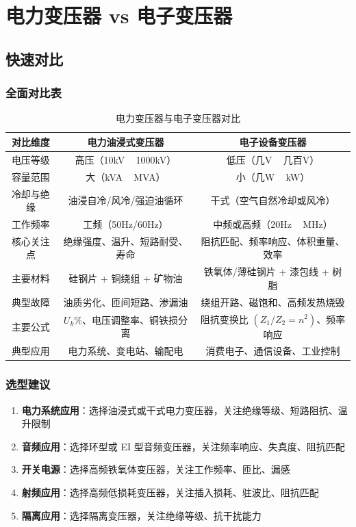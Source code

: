 \documentclass[12pt,UTF8]{ctexbook}
\begin{document}
\part{电力变压器 vs 电子变压器}

\chapter{快速对比}
\label{chap:comparison}

\section{全面对比表}

\begin{table}[htbp]
\centering
\caption{电力变压器与电子变压器对比}
\small
\begin{tabular}{|c|c|c|}
\hline
\textbf{对比维度} & \textbf{电力油浸式变压器} & \textbf{电子设备变压器} \\
\hline
电压等级 & 高压（10kV ~ 1000kV） & 低压（几V ~ 几百V） \\
\hline
容量范围 & 大（kVA ~ MVA） & 小（几W ~ kW） \\
\hline
冷却与绝缘 & 油浸自冷/风冷/强迫油循环 & 干式（空气自然冷却或风冷） \\
\hline
工作频率 & 工频（50Hz/60Hz） & 中频或高频（20Hz ~ MHz） \\
\hline
核心关注点 & 绝缘强度、温升、短路耐受、寿命 & 阻抗匹配、频率响应、体积重量、效率 \\
\hline
主要材料 & 硅钢片 + 铜绕组 + 矿物油 & 铁氧体/薄硅钢片 + 漆包线 + 树脂 \\
\hline
典型故障 & 油质劣化、匝间短路、渗漏油 & 绕组开路、磁饱和、高频发热烧毁 \\
\hline
主要公式 & $U_k\%$、电压调整率、铜铁损分离 & 阻抗变换比 $(Z_1/Z_2 = n^2)$、频率响应 \\
\hline
典型应用 & 电力系统、变电站、输配电 & 消费电子、通信设备、工业控制 \\
\hline
\end{tabular}
\end{table}

\section{选型建议}

\begin{enumerate}
    \item \textbf{电力系统应用}：选择油浸式或干式电力变压器，关注绝缘等级、短路阻抗、温升限制
    \item \textbf{音频应用}：选择环型或 EI 型音频变压器，关注频率响应、失真度、阻抗匹配
    \item \textbf{开关电源}：选择高频铁氧体变压器，关注工作频率、匝比、漏感
    \item \textbf{射频应用}：选择高频低损耗变压器，关注插入损耗、驻波比、阻抗匹配
    \item \textbf{隔离应用}：选择隔离变压器，关注绝缘等级、抗干扰能力
\end{enumerate}

\backmatter
\end{document}
